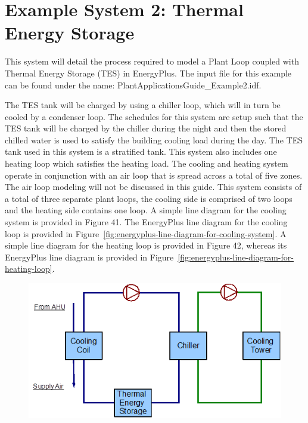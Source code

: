 \chapter{Example System 2: Thermal Energy Storage}\label{example-system-2-thermal-energy-storage}

This system will detail the process required to model a Plant Loop coupled with Thermal Energy Storage (TES) in EnergyPlus. The input file for this example can be found under the name: PlantApplicationsGuide\_Example2.idf.

The TES tank will be charged by using a chiller loop, which will in turn be cooled by a condenser loop. The schedules for this system are setup such that the TES tank will be charged by the chiller during the night and then the stored chilled water is used to satisfy the building cooling load during the day. The TES tank used in this system is a stratified tank. This system also includes one heating loop which satisfies the heating load. The cooling and heating system operate in conjunction with an air loop that is spread across a total of five zones. The air loop modeling will not be discussed in this guide. This system consists of a total of three separate plant loops, the cooling side is comprised of two loops and the heating side contains one loop. A simple line diagram for the cooling system is provided in Figure 41. The EnergyPlus line diagram for the cooling loop is provided in Figure~\ref{fig:energyplus-line-diagram-for-cooling-system}. A simple line diagram for the heating loop is provided in Figure 42, whereas its EnergyPlus line diagram is provided in Figure~\ref{fig:energyplus-line-diagram-for-heating-loop}.

\begin{figure}[htbp]
\centering
\includegraphics{media/image041.png}
\caption{}
\end{figure}

